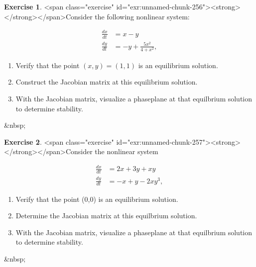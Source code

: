 \documentclass[
]{book}
\theoremstyle{definition}
\theoremstyle{definition}
\theoremstyle{definition}
\newtheorem{exercise}{Exercise}[chapter]
\theoremstyle{remark}
\begin{document}
\begin{exercise}
<span class="exercise" id="exr:unnamed-chunk-256"><strong>\label{exr:unnamed-chunk-256} </strong></span>Consider the following nonlinear system:

\begin{equation}
\begin{split}
\frac{dx}{dt} &= x-y \\
\frac{dy}{dt} &=-y + \frac{5x^2}{4+x^{2}},
\end{split}
\end{equation}

\begin{enumerate}[label=\alph*.]
\item Verify that the point $(x,y)=(1,1)$ is an equilibrium solution.
\item Construct the Jacobian matrix at this equilibrium solution.
\item With the Jacobian matrix, visualize a phaseplane at that equilbrium solution to determine stability.
\end{enumerate}
\end{exercise}
&nbsp;
\begin{exercise}
<span class="exercise" id="exr:unnamed-chunk-257"><strong>\label{exr:unnamed-chunk-257} </strong></span>Consider the nonlinear system

\begin{equation}
\begin{split}
\frac{dx}{dt} &= 2x+3y+xy \\
\frac{dy}{dt} &= -x + y - 2xy^{3},
\end{split}
\end{equation}

\begin{enumerate}[label=\alph*.]
\item Verify that the point (0,0) is an equilibrium solution.
\item Determine the Jacobian matrix at this equilbrium solution.
\item With the Jacobian matrix, visualize a phaseplane at that equilbrium solution to determine stability.
\end{enumerate}
\end{exercise}
&nbsp;
\end{document}
